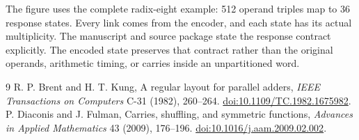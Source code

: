 \documentclass[11pt,a4paper]{article}
\theoremstyle{definition}\newtheorem{definition}[theorem]{Definition}
\begin{document}
The figure uses the complete radix-eight example: 512 operand triples
map to 36 response states. Every link comes from the encoder, and each
state has its actual multiplicity. The manuscript and source package
state the response contract explicitly. The encoded state preserves
that contract rather than the original operands, arithmetic timing,
or carries inside an unpartitioned word.

\begin{thebibliography}{9}
 R. P. Brent and H. T. Kung,
A regular layout for parallel adders,
\emph{IEEE Transactions on Computers} C-31 (1982), 260--264.
\href{https://doi.org/10.1109/TC.1982.1675982}{doi:10.1109/TC.1982.1675982}.
 P. Diaconis and J. Fulman,
Carries, shuffling, and symmetric functions,
\emph{Advances in Applied Mathematics} 43 (2009), 176--196.
\href{https://doi.org/10.1016/j.aam.2009.02.002}{doi:10.1016/j.aam.2009.02.002}.
\end{thebibliography}
\end{document}
